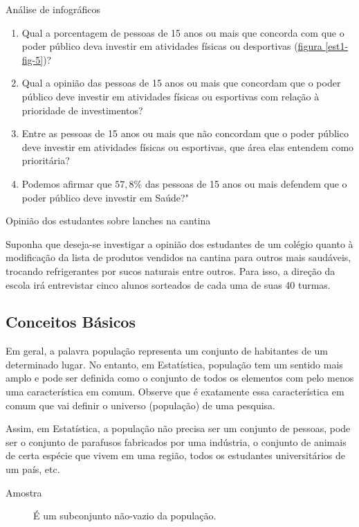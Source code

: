 \begin{task}{ Análise de infográficos}
\begin{enumerate}
\item {} 
Qual a porcentagem de pessoas de 15 anos ou mais que concorda com que o poder público deva investir em atividades físicas ou desportivas (\hyperref[est1-fig-5]{figura \ref{est1-fig-5}})?

\item {} 
Qual a opinião das pessoas de 15 anos ou mais que concordam que o poder público deve investir em atividades físicas ou esportivas com relação à prioridade de investimentos?

\item {} 
Entre as pessoas de 15 anos ou mais que não concordam que o poder público deve investir em atividades físicas ou esportivas, que área elas entendem como prioritária?

\item {} 
Podemos afirmar que $57{,}8\%$ das pessoas de 15 anos ou mais defendem que o poder público deve investir em Saúde?"

\end{enumerate}
\end{task}



\label{est1-org-1}

\begin{example}{Opinião dos estudantes sobre lanches na cantina}

Suponha que deseja-se investigar a opinião dos estudantes de um colégio quanto à modificação da lista de produtos vendidos na cantina para outros mais saudáveis, trocando refrigerantes por sucos naturais entre outros. Para isso, a direção da escola irá entrevistar cinco alunos sorteados de cada uma de suas 40 turmas.

\end{example}

\subsection{Conceitos Básicos}
\label{est1-conceitos-1}


Em geral, a palavra população representa um conjunto de habitantes de um determinado lugar. No entanto, em Estatística, população tem um sentido mais amplo e pode ser definida como o conjunto de todos os elementos com pelo menos uma característica em comum. Observe que é exatamente essa característica em comum que vai definir o universo (população) de uma pesquisa.

Assim, em Estatística, a população não precisa ser um conjunto de pessoas, pode ser o conjunto de parafusos fabricados por uma indústria, o conjunto de animais de certa espécie que vivem em uma região, todos os estudantes universitários de um país, etc.
\begin{description}
\item[Amostra]\leavevmode{}\label{est1-def-4} É um subconjunto não-vazio da população.
\end{description}


